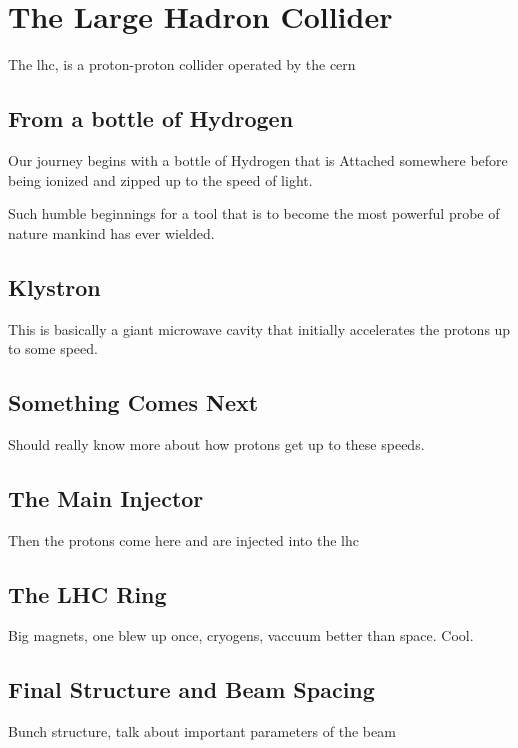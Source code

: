 \chapter{The Large Hadron Collider}
\label{lhc_overview}

\par The \acrfull{lhc}, is a proton-proton collider operated by the \acrfull{cern}

\section{From a bottle of Hydrogen}
\label{from_a_bottle_of_H}

\par Our journey begins with a bottle of Hydrogen that is Attached
somewhere before being ionized and zipped up to the speed of light.  

\par Such humble beginnings for a tool that is to become the most
powerful probe of nature mankind has ever wielded.  

\section{Klystron}
\label{klystron_overview}

\par This is basically a giant microwave cavity that initially
accelerates the protons up to some speed.

\section{Something Comes Next}
\label{something_next}

\par Should really know more about how protons get up to these
speeds.  

\section{The Main Injector}
\label{main_injector_overview}

\par Then the protons come here and are injected into the \acrshort{lhc}

\section{The LHC Ring}
\label{lhc_ring_overview}

\par Big magnets, one blew up once, cryogens, vaccuum better than
space.  Cool.  

\section{Final Structure and Beam Spacing}

\par Bunch structure, talk about important parameters of the beam
